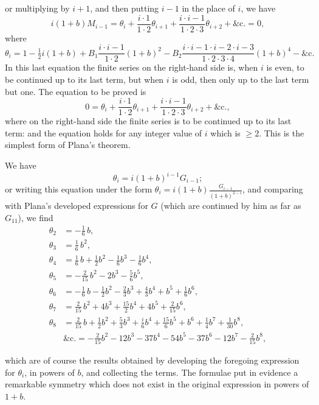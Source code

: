 \documentclass[11pt,a4paper]{article}
\begin{document}
or multiplying by $i + 1$, and then putting $i - 1$ in the place of $i$, we have
\[
i(1+b)M_{i-1} = \theta_{i} + \frac{i \cdot 1}{1 \cdot 2}\theta_{i+1} + \frac{i \cdot i-1}{1 \cdot 2 \cdot 3}\theta_{i+2} + \&\mathrm{c.} = 0,
\]
where
\[
\theta_{i} = 1 - \tfrac{1}{2}i(1+b) + B_{1}\frac{i \cdot i-1}{1 \cdot 2}(1+b)^{2} - B_{2}\frac{i \cdot i-1 \cdot i-2 \cdot i-3}{1 \cdot 2 \cdot 3 \cdot 4}(1+b)^{4} - \&\mathrm{c.}
\]
In this last equation the finite series on the right-hand side is, when $i$ is even, to be continued up to its last term, but when $i$ is odd, then only up to the last term but one. The equation to be proved is
\[
0 = \theta_{i} + \frac{i \cdot 1}{1 \cdot 2}\theta_{i+1} + \frac{i \cdot i-1}{1 \cdot 2 \cdot 3}\theta_{i+2} + \&\mathrm{c.},
\]
where on the right-hand side the finite series is to be continued up to its last term: and the equation holds for any integer value of $i$ which is $\geq 2$. This is the simplest form of Plana's theorem.

We have
\[
\theta_{i} = i(1+b)^{i-1} G_{i-1};
\]
or writing this equation under the form $\theta_{i} = i(1+b)\frac{G_{i-1}}{(1+b)^{2-i}}$, and comparing with Plana's developed expressions for $G$ (which are continued by him as far as $G_{11}$), we find
\[
\begin{aligned}
\theta_{2} &= -\tfrac{1}{6}\,b, \\
\theta_{3} &= \tfrac{1}{6}\,b^{2}, \\
\theta_{4} &= \tfrac{1}{6}\,b + \tfrac{1}{2}b^{2} - \tfrac{1}{6}b^{3} - \tfrac{1}{6}b^{4}, \\
\theta_{5} &= -\tfrac{2}{15}\,b^{2} - 2 b^{3} - \tfrac{5}{6}b^{5}, \\
\theta_{6} &= -\tfrac{1}{6}\,b - \tfrac{1}{2}b^{2} - \tfrac{2}{3}b^{3} + \tfrac{4}{3}b^{4} + b^{5} + \tfrac{1}{6}b^{6}, \\
\theta_{7} &= \tfrac{2}{15}\,b^{2} + 4 b^{3} + \tfrac{15}{2}b^{4} + 4 b^{5} + \tfrac{2}{15}b^{6}, \\
\theta_{8} &= \tfrac{2}{15}\,b + \tfrac{1}{2}b^{2} + \tfrac{5}{3}b^{3} + \tfrac{i}{6}b^{4} + \tfrac{15}{6}b^{5} + b^{6} + \tfrac{1}{4}b^{7} + \tfrac{1}{30}b^{8}, \\
&\&\mathrm{c.} = -\tfrac{2}{15}b^{2} - 12 b^{3} - 37 b^{4} - 54 b^{5} - 37 b^{6} - 12 b^{7} - \tfrac{2}{15}b^{8},
\end{aligned}
\]

\setcounter{page}{95}

which are of course the results obtained by developing the foregoing expression for $\theta_{i}$, in powers of $b$, and collecting the terms. The formulae put in evidence a remarkable symmetry which does not exist in the original expression in powers of $1+b$.
\end{document}
